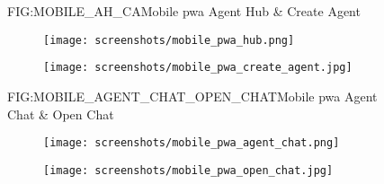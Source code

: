 \begin{figure}[Mobile -- Agent Hub \& Create Agent]{FIG:MOBILE_AH_CA}{Mobile \ac{pwa} Agent Hub \& Create Agent}
    \begin{subfigure}[FIG:MOBILE_AGENT_HUB]{Agent Hub}{\texttt{[image: screenshots/mobile\_pwa\_hub.png]}}
    \end{subfigure}
    \hspace{2em}
    \begin{subfigure}[FIG:MOBILE_CREATE_AGENT]{Create Agent}{\texttt{[image: screenshots/mobile\_pwa\_create\_agent.jpg]}}
    \end{subfigure}
\end{figure}

\begin{figure}[Mobile -- Agent Chat \& Open Chat]{FIG:MOBILE_AGENT_CHAT_OPEN_CHAT}{Mobile \ac{pwa} Agent Chat \& Open Chat}
    \begin{subfigure}[FIG:MOBILE_AGENT_CHAT]{Agent Chat}{\texttt{[image: screenshots/mobile\_pwa\_agent\_chat.png]}}
    \end{subfigure}
    \hspace{2em}
    \begin{subfigure}[FIG:MOBILE_OPEN_CHAT]{Open Chat}{\texttt{[image: screenshots/mobile\_pwa\_open\_chat.jpg]}}
    \end{subfigure}
\end{figure}
